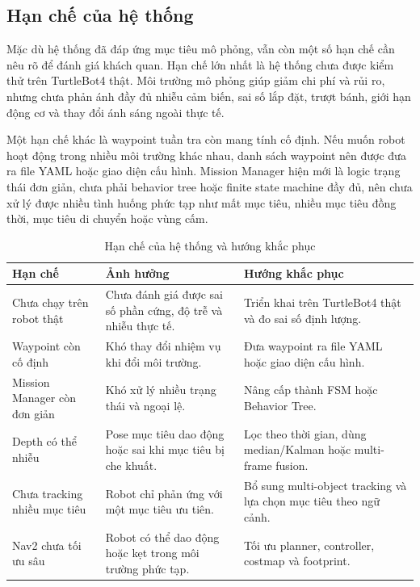 \subsection{Hạn chế của hệ thống}
\label{subsec:system-limitations}

Mặc dù hệ thống đã đáp ứng mục tiêu mô phỏng, vẫn còn một số hạn chế cần nêu rõ để đánh giá khách quan. Hạn chế lớn nhất là hệ thống chưa được kiểm thử trên TurtleBot4 thật. Môi trường mô phỏng giúp giảm chi phí và rủi ro, nhưng chưa phản ánh đầy đủ nhiễu cảm biến, sai số lắp đặt, trượt bánh, giới hạn động cơ và thay đổi ánh sáng ngoài thực tế.

Một hạn chế khác là waypoint tuần tra còn mang tính cố định. Nếu muốn robot hoạt động trong nhiều môi trường khác nhau, danh sách waypoint nên được đưa ra file YAML hoặc giao diện cấu hình. Mission Manager hiện mới là logic trạng thái đơn giản, chưa phải behavior tree hoặc finite state machine đầy đủ, nên chưa xử lý được nhiều tình huống phức tạp như mất mục tiêu, nhiều mục tiêu đồng thời, mục tiêu di chuyển hoặc vùng cấm.

\begin{table}[H]
    \centering
    \caption{Hạn chế của hệ thống và hướng khắc phục}
    \label{tab:system-limitations}
    \renewcommand{\arraystretch}{1.25}
    \small
    \begin{tabularx}{\textwidth}{|>{\raggedright\arraybackslash}p{}|>{\raggedright\arraybackslash}p{}|>{\raggedright\arraybackslash}X|}
        \hline
        \textbf{Hạn chế} & \textbf{Ảnh hưởng} & \textbf{Hướng khắc phục} \\
        \hline
        Chưa chạy trên robot thật & Chưa đánh giá được sai số phần cứng, độ trễ và nhiễu thực tế. & Triển khai trên TurtleBot4 thật và đo sai số định lượng. \\
        \hline
        Waypoint còn cố định & Khó thay đổi nhiệm vụ khi đổi môi trường. & Đưa waypoint ra file YAML hoặc giao diện cấu hình. \\
        \hline
        Mission Manager còn đơn giản & Khó xử lý nhiều trạng thái và ngoại lệ. & Nâng cấp thành FSM hoặc Behavior Tree. \\
        \hline
        Depth có thể nhiễu & Pose mục tiêu dao động hoặc sai khi mục tiêu bị che khuất. & Lọc theo thời gian, dùng median/Kalman hoặc multi-frame fusion. \\
        \hline
        Chưa tracking nhiều mục tiêu & Robot chỉ phản ứng với một mục tiêu ưu tiên. & Bổ sung multi-object tracking và lựa chọn mục tiêu theo ngữ cảnh. \\
        \hline
        Nav2 chưa tối ưu sâu & Robot có thể dao động hoặc kẹt trong môi trường phức tạp. & Tối ưu planner, controller, costmap và footprint. \\
        \hline
    \end{tabularx}
\end{table}

